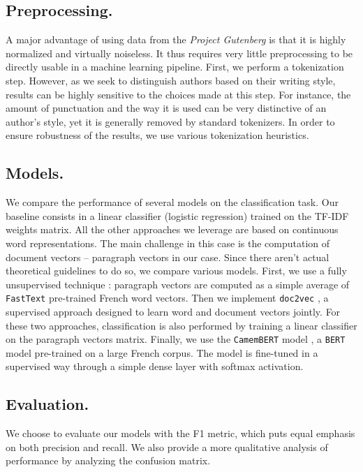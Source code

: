 \documentclass[11pt,a4paper]{article}
\begin{document}
\subsection{Preprocessing.} 

A major advantage of using data from the \textit{Project Gutenberg} is that it is highly normalized and virtually noiseless. It thus requires very little preprocessing to be directly usable in a machine learning pipeline. First, we perform a tokenization step. However, as we seek to distinguish authors based on their writing style, results can be highly sensitive to the choices made at this step. For instance, the amount of punctuation and the way it is used can be very distinctive of an author's style, yet it is generally removed by standard tokenizers. In order to ensure robustness of the results, we use various tokenization heuristics.

\subsection{Models.} 

We compare the performance of several models on the classification task. Our baseline consists in a linear classifier (logistic regression) trained on the TF-IDF weights matrix. All the other approaches we leverage are based on continuous word representations. The main challenge in this case is the computation of document vectors -- paragraph vectors in our case. Since there aren't actual theoretical guidelines to do so, we compare various models. First, we use a fully unsupervised technique : paragraph vectors are computed as a simple average of \verb|FastText| \cite{joulin2016bag} pre-trained French word vectors. Then we implement \verb|doc2vec| \cite{le2014distributed}, a supervised approach designed to learn word and document vectors jointly. For these two approaches, classification is also performed by training a linear classifier on the paragraph vectors matrix. Finally, we use the \verb|CamemBERT| model \cite{martin2019camembert}, a \verb|BERT| model pre-trained on a large French corpus. The model is fine-tuned in a supervised way through a simple dense layer with softmax activation.

\subsection{Evaluation.}  

We choose to evaluate our models with the F1 metric, which puts equal emphasis on both precision and recall. We also provide a more qualitative analysis of performance by analyzing the confusion matrix. 
\end{document}
